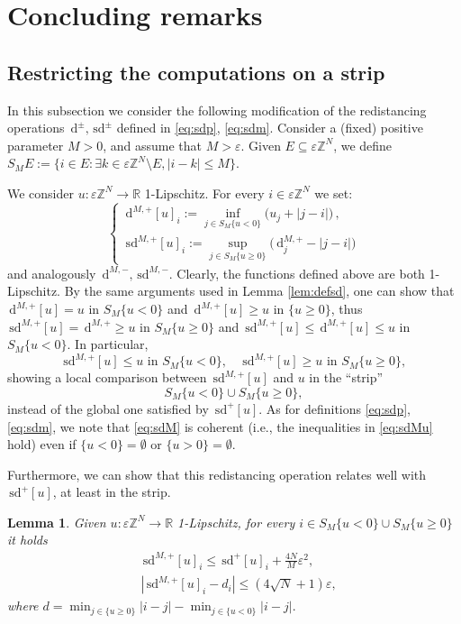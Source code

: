 \documentclass[10pt]{amsart}
\theoremstyle{plain}
\newtheorem{lemma}[theorem]{Lemma}
\theoremstyle{definition}
\newcommand{\R}{\mathbb{R}}
\newcommand{\Z}{\mathbb{Z}}
\newcommand{\e}{\varepsilon}
\newcommand{\ud}{\,\mathrm{d}}
\newcommand{\sd}{\,\mathrm{sd}}
\newcommand{\ez}{\e\Z^N}
\numberwithin{equation}{section}
\begin{document}
 

\section{Concluding remarks}\label{sec:concluding}

\subsection{Restricting the computations on a strip}\label{sec:strips}
In this subsection we consider the following modification of the redistancing operations $\ud^\pm,\sd^\pm$ defined in \eqref{eq:sdp}, \eqref{eq:sdm}. Consider a (fixed) positive parameter $M>0$, and assume that $M>\e$. Given $E\subseteq \ez$, we  define $S_M E:=\{ i\in E : \exists k\in \ez\setminus E, |i-k|\le M \}$.

  {We  consider $u:\ez\to\R$    1-Lipschitz. For every  $i\in\ez$  we set:}
\begin{equation}\label{eq:sdM}
  \begin{cases}
    \ud^{M,+}[u]_i := \inf_{j\in S_M\{u<0\}  }   {(} u_j + |j-i|  {)}\,,\\
    \sd^{M,+}[u]_i := \sup_{j\in S_M\{u\ge 0\}}   {(} \ud^{M,+}_j - |j-i|   {)}
  \end{cases}
\end{equation}
and analogously  $\ud^{M,-},\sd^{M,-}$.  Clearly, the %
functions defined above are both 1-Lipschitz. By the same arguments used in Lemma \ref{lem:defsd}, one can show that $\ud^{M,+}[u] = u$ in $S_M\{u<0\}$ and $\ud^{M,+}[u] \ge  u$ in $\{ u\ge 0\}$, thus $\sd^{M,+}[u] = \ud^{M,+}\ge u$ in $S_M\{u\ge 0\}$ and $\sd^{M,+}[u] \le  \ud^{M,+}[u] \le u$ in $S_M\{u< 0\}$.
In particular,
\begin{equation}\label{eq:sdMu}
    \sd^{M,+}[u] \le u \text{ in } S_M\{u< 0\}, \quad \sd^{M,+}[u] \ge u \text{ in } S_M\{u\ge  0\},
\end{equation}
showing a local comparison between $\sd^{M,+}[u]$ and $u$ in the ``strip'' 
\[
    S_M\{u< 0\}\cup S_M\{u\ge 0\}, 
\]
instead of the global one satisfied by $\sd^+[u]$. As for definitions \eqref{eq:sdp}, \eqref{eq:sdm}, we note that   \eqref{eq:sdM} is coherent (i.e., the inequalities in \eqref{eq:sdMu} hold)  even if $\{u<0\}=\emptyset$ or $\{u>0\}=\emptyset$.



Furthermore, we can show that this  redistancing operation relates well with $\sd^+[u]$, at least in the strip.
\begin{lemma}\label{lem:compsdsdM}
Given   {$u:\ez\to\R$} 1-Lipschitz, for every $ i\in S_M\{u< 0\}\cup S_M\{u\ge 0\}$ it holds
\begin{align}
    &\sd^{M,+}[u]_i\le \sd^{+}[u]_i +  \frac{4N}M\e^2,\label{eq:sdMone}\\
    &|\sd^{M,+}[u]_i-d_i|\le   {(4\sqrt N+1)}\e,\label{eq:sdMtwo}
\end{align}
where $d=\min_{j\in \{u\ge 0\}}|i-j|-\min_{j\in \{u<0\}}|i-j|. $
\end{lemma} 
\end{document}
